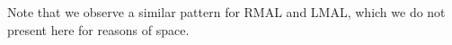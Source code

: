 Note that we observe a similar pattern for RMAL and LMAL, which we do not present here for reasons of space.

